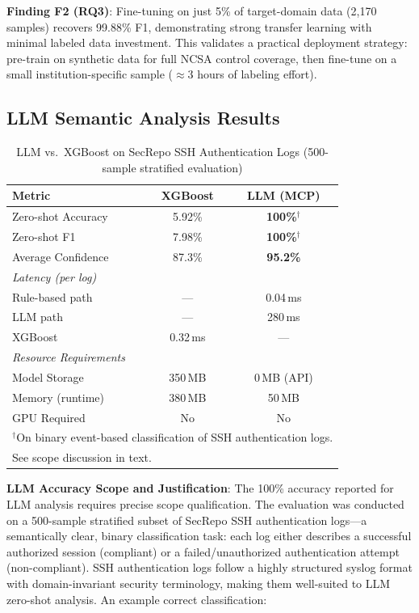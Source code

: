 \documentclass[11pt,conference]{IEEEtran}
\begin{document}
\textbf{Finding F2 (RQ3)}: Fine-tuning on just 5\% of target-domain data (2,170 samples) recovers 99.88\% F1, demonstrating strong transfer learning with minimal labeled data investment. This validates a practical deployment strategy: pre-train on synthetic data for full NCSA control coverage, then fine-tune on a small institution-specific sample ($\approx$3 hours of labeling effort).

\subsection{LLM Semantic Analysis Results}

\begin{table}[!t]
\centering
\caption{LLM vs.\ XGBoost on SecRepo SSH Authentication Logs (500-sample stratified evaluation)}
\label{tab:llm_results}
\begin{tabular}{@{}lcc@{}}
\toprule
\textbf{Metric} & \textbf{XGBoost} & \textbf{LLM (MCP)} \\
\midrule
Zero-shot Accuracy & 5.92\% & \textbf{100\%}$^\dagger$ \\
Zero-shot F1 & 7.98\% & \textbf{100\%}$^\dagger$ \\
Average Confidence & 87.3\% & \textbf{95.2\%} \\
\midrule
\multicolumn{3}{l}{\textit{Latency (per log)}} \\
\quad Rule-based path & --- & 0.04\,ms \\
\quad LLM path & --- & 280\,ms \\
\quad XGBoost & 0.32\,ms & --- \\
\midrule
\multicolumn{3}{l}{\textit{Resource Requirements}} \\
\quad Model Storage & 350\,MB & 0\,MB (API) \\
\quad Memory (runtime) & 380\,MB & 50\,MB \\
\quad GPU Required & No & No \\
\bottomrule
\multicolumn{3}{l}{\footnotesize $^\dagger$On binary event-based classification of SSH authentication logs.} \\
\multicolumn{3}{l}{\footnotesize See scope discussion in text.} \\
\end{tabular}
\end{table}

\textbf{LLM Accuracy Scope and Justification}: The 100\% accuracy reported for LLM analysis requires precise scope qualification. The evaluation was conducted on a 500-sample stratified subset of SecRepo SSH authentication logs---a semantically clear, binary classification task: each log either describes a successful authorized session (compliant) or a failed/unauthorized authentication attempt (non-compliant). SSH authentication logs follow a highly structured syslog format with domain-invariant security terminology, making them well-suited to LLM zero-shot analysis. An example correct classification:
\end{document}
